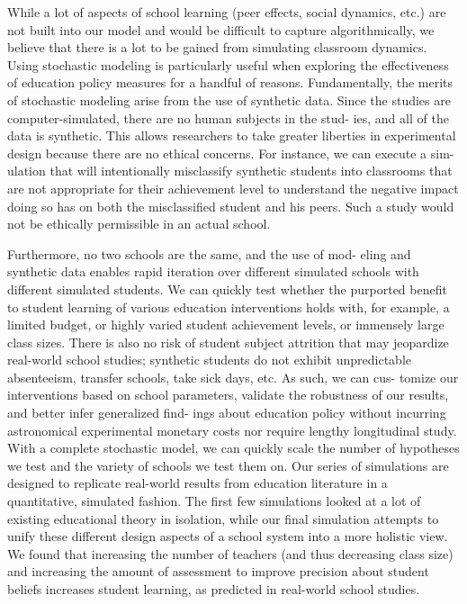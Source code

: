 \documentclass[man]{apa6}
\begin{document}
While a lot of aspects of school learning (peer effects, social
dynamics, etc.) are not built into our model and would be difficult to
capture algorithmically, we believe that there is a lot to be gained
from simulating classroom dynamics. Using stochastic modeling is
particularly useful when exploring the effectiveness of education policy
measures for a handful of reasons. Fundamentally, the merits of
stochastic modeling arise from the use of synthetic data. Since the
studies are computer-simulated, there are no human subjects in the stud-
ies, and all of the data is synthetic. This allows researchers to take
greater liberties in experimental design because there are no ethical
concerns. For instance, we can execute a sim- ulation that will
intentionally misclassify synthetic students into classrooms that are
not appropriate for their achievement level to understand the negative
impact doing so has on both the misclassified student and his peers.
Such a study would not be ethically permissible in an actual school.

Furthermore, no two schools are the same, and the use of mod- eling and
synthetic data enables rapid iteration over different simulated schools
with different simulated students. We can quickly test whether the
purported benefit to student learning of various education interventions
holds with, for example, a limited budget, or highly varied student
achievement levels, or immensely large class sizes. There is also no
risk of student subject attrition that may jeopardize real-world school
studies; synthetic students do not exhibit unpredictable absenteeism,
transfer schools, take sick days, etc. As such, we can cus- tomize our
interventions based on school parameters, validate the robustness of our
results, and better infer generalized find- ings about education policy
without incurring astronomical experimental monetary costs nor require
lengthy longitudinal study. With a complete stochastic model, we can
quickly scale the number of hypotheses we test and the variety of
schools we test them on. Our series of simulations are designed to
replicate real-world results from education literature in a
quantitative, simulated fashion. The first few simulations looked at a
lot of existing educational theory in isolation, while our final
simulation attempts to unify these different design aspects of a school
system into a more holistic view. We found that increasing the number of
teachers (and thus decreasing class size) and increasing the amount of
assessment to improve precision about student beliefs increases student
learning, as predicted in real-world school studies.
\end{document}
